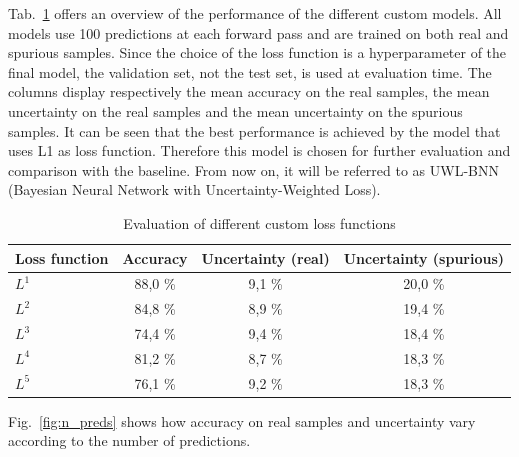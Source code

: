 \documentclass[11pt,twoside,a4paper]{article}
\begin{document}
Tab.~\ref{tab:custom} offers an overview of the performance of the different custom models. All models use 100 predictions at each forward pass and are trained on both real and spurious samples. Since the choice of the loss function is a hyperparameter of the final model, the validation set, not the test set, is used at evaluation time. The columns display respectively the mean accuracy on the real samples, the mean uncertainty on the real samples and the mean uncertainty on the spurious samples. It can be seen that the best performance is achieved by the model that uses L1 as loss function. Therefore this model is chosen for further evaluation and comparison with the baseline. From now on, it will be referred to as UWL-BNN (Bayesian Neural Network with Uncertainty-Weighted Loss).

\begin{table}[!h]
  \begin{adjustwidth}{-.5in}{-.5in}
  \begin{center}
    \begin{tabular}{l | c | c | c}
      Loss function	& Accuracy	& Uncertainty (real)	& Uncertainty (spurious) \\
      \hline
      \(L^1\)		& 88,0 \%		& 9,1  \% 			& 20,0 \% \\      
      \(L^2\)		& 84,8 \%		& 8,9 \% 			& 19,4 \% \\      
      \(L^3\)		& 74,4 \%		& 9,4 \% 			& 18,4 \% \\      
      \(L^4\)		& 81,2 \%		& 8,7 \% 			& 18,3 \% \\      
      \(L^5\)		& 76,1 \%		& 9,2 \% 			& 18,3 \% \\      
    \end{tabular}
    \caption{Evaluation of different custom loss functions}
    \label{tab:custom}
  \end{center}
  \end{adjustwidth}
\end{table}

Fig.~\ref{fig:n_preds} shows how accuracy on real samples and uncertainty vary according to the number of predictions.
\end{document}
